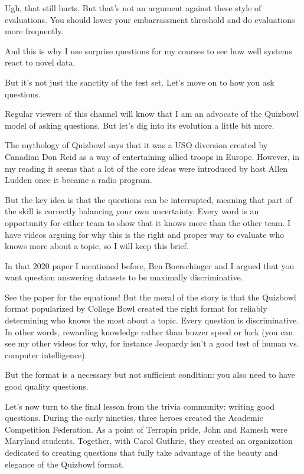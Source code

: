 Ugh, that still hurts. But that’s not an argument against these style of evaluations.  You should lower your embarrassment threshold and do evaluations more frequently.

And this is why I use surprise questions for my courses to see how well systems react to novel data.

But it’s not just the sanctity of the test set.  Let’s move on to how you ask questions.

Regular viewers of this channel will know that I am an advocate of the Quizbowl model of asking questions.  But let’s dig into its evolution a little bit more.  

The mythology of Quizbowl says that it was a USO diversion created by Canadian Don Reid as a way of entertaining allied troops in Europe.  However, in my reading it seems that a lot of the core ideas were introduced by host Allen Ludden once it became a radio program.  

But the key idea is that the questions can be interrupted, meaning that part of the skill is correctly balancing your own uncertainty.  Every word is an opportunity for either team to show that it knows more than the other team.  I have videos arguing for why this is the right and proper way to evaluate who knows more about a topic, so I will keep this brief.  

In that 2020 paper I mentioned before, Ben Boerschinger and I argued that you want question answering datasets to be maximally discriminative. 

See the paper for the equations!  But the moral of the story is that the Quizbowl format popularized by College Bowl created the right format for reliably determining who knows the most about a topic.  Every question is discriminative.  In other words, rewarding knowledge rather than buzzer speed or luck (you can see my other videos for why, for instance Jeopardy isn’t a good test of human vs. computer intelligence).

But the format is a necessary but not sufficient condition: you also need to have good quality questions.  

Let’s now turn to the final lesson from the trivia community: writing good questions.  During the early nineties, three heroes created the Academic Competition Federation.  As a point of Terrapin pride, John and Ramesh were Maryland students.  Together, with Carol Guthrie, they created an organization dedicated to creating questions that fully take advantage of the beauty and elegance of the Quizbowl format.

